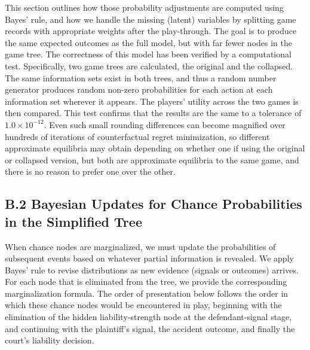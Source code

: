 \documentclass{article}
\begin{document}
This section outlines how those probability adjustments are computed using Bayes’ rule, and how we handle the missing (latent) variables by splitting game records with appropriate weights after the play-through. The goal is to produce the same expected outcomes as the full model, but with far fewer nodes in the game tree. The correctness of this model has been verified by a computational test. Specifically, two game trees are calculated, the original and the collapsed. The same information sets exist in both trees, and thus a random number generator produces random non-zero probabilities for each action at each information set wherever it appears. The players' utility across the two games is then compared. This test confirms that the results are the same to a tolerance of $1.0 \times 10^{-12}$. Even such small rounding differences can become magnified over hundreds of iterations of counterfactual regret minimization, so different approximate equilibria may obtain depending on whether one if using the original or collapsed version, but both are approximate equilibria to the same game, and there is no reason to prefer one over the other.

\subsection*{B.2 Bayesian Updates for Chance Probabilities in the Simplified Tree}

When chance nodes are marginalized, we must update the probabilities of subsequent events based on whatever partial information is revealed. We apply Bayes’ rule to revise distributions as new evidence (signals or outcomes) arrives. For each node that is eliminated from the tree, we provide the corresponding marginalization formula. The order of presentation below follows the order in which these chance nodes would be encountered in play, beginning with the elimination of the hidden liability-strength node at the defendant-signal stage, and continuing with the plaintiff’s signal, the accident outcome, and finally the court’s liability decision.
\end{document}
